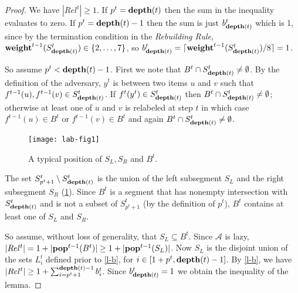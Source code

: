 \documentclass[unicode,review]{siamart1116}
\newcommand{\A}{\mathcal{A}}
\newcommand{\natInt}[2]{ \left\{ #1, \dotsc, #2 \right\} }
\newcommand{\pop}{{\rm {\bf pop}}}
\newcommand{\weight}{{\rm {\bf weight}}}
\newcommand{\depth}{{\rm {\bf depth}}}
\numberwithin{theorem}{section}
\begin{document}
\begin{proof}
We have $|Rel^t| \geq 1$.
If $p^t = \depth(t)$ then the sum in the inequality evaluates to zero. If $p^t=\depth(t)-1$ then the sum is just $b^t_{\depth(t)}$
which is 1, since
by the termination condition in the \emph{Rebuilding Rule}, $\weight^{t-1}(S^t_{\depth(t)}) \in \natInt{2}{7}$, so $b^t_{\depth(t)} = \lceil \weight^{t-1}(S^t_{\depth(t)})/8 \rceil = 1$.

So assume $p^t < \depth(t)-1$.
First we note that $B^t \cap 
S^t_{\depth(t)} \neq \emptyset$.
By the definition of the adversary, $y^t$
is between two items $u$ and $v$ such that $f^{t-1}(u),f^{t-1}(v) \in S^t_{\depth(t)}$.  If $f^t(y^t)\in S^t_{\depth(t)}$ then
$B^t \cap S^t_{\depth(t)} \neq \emptyset$; otherwise
at least one of $u$ and $v$ is relabeled at step $t$
in which case $f^{t-1}(u)\in B^t$ or $f^{t-1}(v) \in B^t$ and
again $B^t \cap S^t_{\depth(t)} \neq \emptyset$.


\begin{figure}
  \begin{center}
    \texttt{[image: lab-fig1]}
    \caption{A typical position of $S_L,S_R$ and $B^t$.}
    \label{f-1}
  \end{center}
\end{figure}

The set $S^t_{p^t+1} \setminus S^t_{\depth(t)}$ 
is the union of the left subsegment $S_L$ and the right subsegment $S_R$ (\cref{f-1}). Since $B^t$ is a segment that has nonempty
intersection with $S^t_{\depth(t)}$ and is not
a subset of $S^t_{p^t+1}$ (by the definition of $p^t$),
$B^t$ contains at least one of $S_L$ and $S_R$.

\iffalse
Suppose for contradiction that $B^t$ misses some label $a_L \in S_L$ and some label $a_R \in S_R$. 
Since $B^t$ is  nonempty
intersection with $S^t_{\depth(t)}$ The segment
$S^t_{\depth(t)}$ is a subsegment of $\natInt{a_L}{a_R}$
that contains $y^t$ (since the adversary chose $y^t$ 
to be between two items
$u,v$ that were stored  in $S^{t}_{\depth(t)}$ by $f^{t-1}$.
If neither $u$ nor $v$ was relabeled by $f^t$ then (by the laziness of $\A$),
$Rel^t=\{y^t\}$ and $B^t \subseteq S^t_{\depth(t)}$ which would imply $p^t=\depth(t)$,
contradicting our assumption
that $p^t < \depth(t)-1$.  So at least one of $u,v$ belongs to $Rel^t$. Thus
$B^t$ is a subsegment of $\natInt{a_L}{a_R} \subseteq S^{p^t+1}$ having nonempty intersection with  $S^t_{\depth(t)}$. Since, by assumption $B^t$ is a segment containing neither  $a_L$ nor $a_R$
it is a subset of $\natInt{a_L}{a_R}$ which contradicts the fact (from the definition of $p^t$) 
that $B^t$ is not a subset of $S^t_{p^t+1}$.   
\fi

So assume, without loss of generality, that $S_L \subseteq B^t$.
Since $\A$ is lazy, $|Rel^t|=1+|\pop^{t-1}(B^t)| \geq 1+|\pop^{t-1}(S_L)|$.
Now $S_L$ is the disjoint union of the sets $L^t_i$ defined prior to \cref{l-b}, for $i \in [1+p^t,\depth(t)-1]$.  
By \cref{l-b}, we have $|Rel^t| \geq 1+ \sum_{i=p^t+1}^{\depth(t)-1} b^t_i$.
Since $b^t_{\depth(t)}=1$ we obtain the inequality
of the lemma.
\end{proof}
\end{document}
